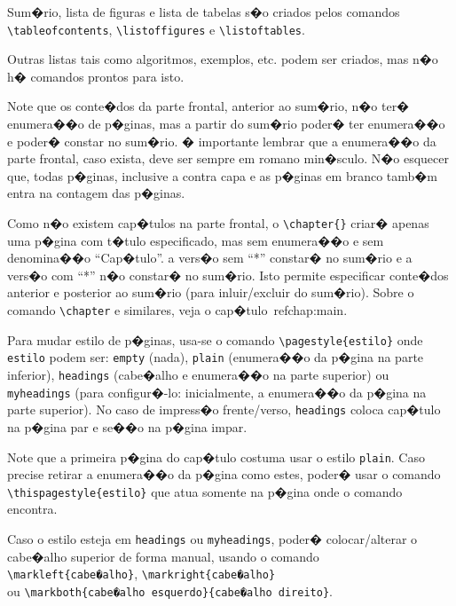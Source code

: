 \documentclass[12pt,a4paper,oneside, openany, titlepage]{book}
\begin{document}
Sum�rio, lista de figuras e lista de tabelas s�o criados pelos comandos
\verb+\tableofcontents+, \verb+\listoffigures+ e \verb+\listoftables+.

Outras listas tais como algoritmos, exemplos, etc. podem ser criados, mas n�o 
h� comandos prontos para isto.

Note que os conte�dos da parte frontal, anterior ao sum�rio, n�o ter� enumera��o
de p�ginas, mas a partir do sum�rio poder� ter enumera��o e poder� constar 
no sum�rio. 
 � importante lembrar que a enumera��o da parte frontal,
caso exista, deve ser sempre em romano min�sculo.
N�o esquecer que, todas p�ginas, inclusive a contra capa e 
as p�ginas em branco tamb�m entra na contagem das p�ginas.

Como n�o existem cap�tulos na parte frontal, o \verb+\chapter{}+ 
criar� apenas uma p�gina com t�tulo especificado, mas sem enumera��o 
e sem denomina��o ``Cap�tulo''. a vers�o sem ``*'' constar� no sum�rio e 
a vers�o com ``*'' n�o constar� no sum�rio. 
Isto permite especificar conte�dos anterior e posterior ao
sum�rio (para inluir/excluir do sum�rio).
Sobre o comando \verb+\chapter+ e similares, veja o cap�tulo~ref{chap:main}.

Para mudar estilo de p�ginas, usa-se o comando \verb|\pagestyle{estilo}|
onde \texttt{estilo} podem ser:
 \texttt{empty} (nada), \texttt{plain} (enumera��o da p�gina na parte inferior),
 \texttt{headings} (cabe�alho e enumera��o na parte superior) 
 ou \texttt{myheadings} 
(para configur�-lo: inicialmente, a enumera��o da p�gina na parte superior).
 No caso de impress�o frente/verso, \texttt{headings} coloca cap�tulo 
 na p�gina par e se��o na p�gina impar.

Note que a primeira p�gina do cap�tulo costuma usar o estilo \texttt{plain}.
Caso precise retirar a enumera��o da p�gina como estes, poder� usar o comando
 \verb+\thispagestyle{estilo}+ que atua somente na p�gina onde 
 o comando encontra.

Caso o estilo esteja em \texttt{headings} ou \texttt{myheadings}, 
poder� colocar/alterar 
o cabe�alho superior de forma manual, usando o comando \\
\verb+\markleft{cabe�alho}+, \verb+\markright{cabe�alho}+ \\
 ou \verb+\markboth{cabe�alho esquerdo}{cabe�alho direito}+.
\end{document}
